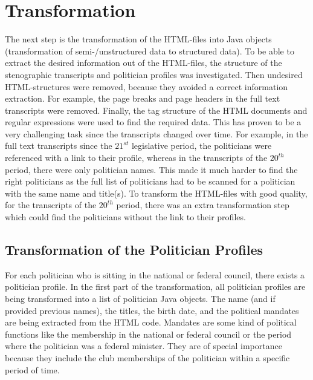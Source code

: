 \section{Transformation}
\label{sec:transformation}
The next step is the transformation of the HTML-files into Java objects (transformation of semi-/unstructured data to structured data). To be able to extract the desired information out of the HTML-files, the structure of the stenographic transcripts and politician profiles was investigated. Then undesired HTML-structures were removed, because they avoided a correct information extraction. For example, the page breaks and page headers in the full text transcripts were removed. Finally, the tag structure of the HTML documents and regular expressions were used to find the required data. 
This has proven to be a very challenging task since the transcripts changed over time. For example, in the full text transcripts since the $21^{st}$ legislative period, the politicians were referenced with a link to their profile, whereas in the transcripts of the $20^{th}$ period, there were only politician names. This made it much harder to find the right politicians as the full list of politicians had to be scanned for a politician with the same name and title(s). To transform the HTML-files with good quality, for the transcripts of the $20^{th}$ period, there was an extra transformation step which could find the politicians without the link to their profiles.

\subsection{Transformation of the Politician Profiles}
For each politician who is sitting in the national or federal council, there exists a politician profile. In the first part of the transformation, all politician profiles are being transformed into a list of politician Java objects. The name (and if provided previous names), the titles, the birth date, and the political mandates are being extracted from the HTML code. Mandates are some kind of political functions like the membership in the national or federal council or the period where the politician was a federal minister. They are of special importance because they include the club memberships of the politician within a specific period of time. 

